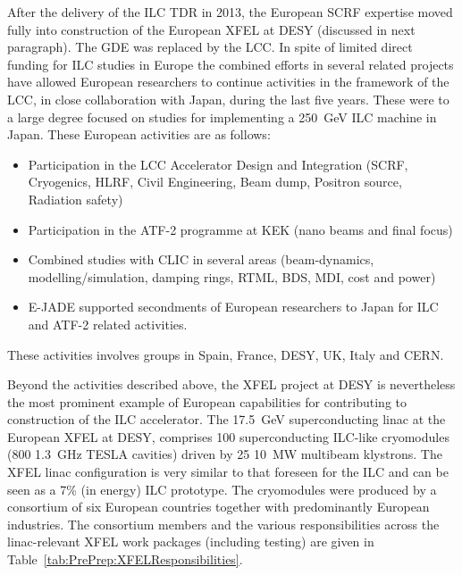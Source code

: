\documentclass[%
 reprint,
 amsmath,amssymb,
 aps,
]{revtex4-1}
\begin{document}
After the delivery of the ILC TDR in 2013, the European SCRF expertise moved fully into construction of the European XFEL at DESY (discussed in next paragraph). 
The GDE was replaced by the LCC. In spite of limited direct funding for ILC studies in Europe the combined efforts in 
several related projects have allowed European researchers to continue activities in the framework of the LCC, in close collaboration with Japan, during
the last five years. These were to a large degree focused on studies for implementing a 250~GeV ILC machine in Japan. 
These European activities are as follows:
\begin{itemize}
\item Participation in the LCC Accelerator Design and Integration (SCRF, Cryogenics, HLRF, Civil Engineering, Beam dump, Positron source, Radiation safety)
\item Participation in the ATF-2 programme at KEK (nano beams and final focus)
\item Combined studies with CLIC in several areas (beam-dynamics, modelling/simulation, damping rings, RTML, BDS, MDI, cost and power)
\item E-JADE supported secondments of European researchers to Japan for ILC and ATF-2 related activities.
\end{itemize}
These activities involves groups in Spain, France, DESY, UK, Italy and CERN. 



\vspace{0.15cm}
Beyond the activities described above, the XFEL project at DESY is nevertheless the most prominent example of European capabilities for contributing to construction of the ILC accelerator.
The 17.5~GeV superconducting linac at the European XFEL at DESY, comprises 100 superconducting ILC-like cryomodules (800 1.3~GHz TESLA cavities) driven by 25 10~MW multibeam klystrons. The XFEL linac configuration is very similar to that foreseen for the ILC and can be seen as a 7\% (in energy) ILC prototype. The cryomodules were produced by a consortium of six European countries together with predominantly European industries. The consortium members and the various responsibilities across the linac-relevant XFEL work packages (including testing) are given in Table~\ref{tab:PrePrep:XFELResponsibilities}.
\end{document}
